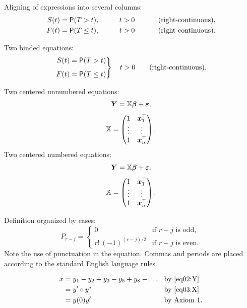 Aligning of expressions into several columns:
\begin{alignat*}{3}
S(t) &= \operatorname{\textsf{P}}(T > t),    &\qquad t&>0       &\qquad&\text{ (right-continuous),}\\
F(t) &= \operatorname{\textsf{P}}(T \leq t), &\qquad t&>0       &\qquad&\text{ (right-continuous).}
\end{alignat*}

Two binded equations:
\begin{equation}\label{eq01:FS}
\left.
\begin{aligned}
S(t) &= \operatorname{\textsf{P}}(T > t) \\[1ex]
F(t) &= \operatorname{\textsf{P}}(T \leq t)
\end{aligned}
\right\}
\quad t>0 \qquad \text{(right-continuous).}
\end{equation}

Two centered unnumbered equations:
\begin{gather*}
\bm Y = \mathbb{X}\bm\beta + \bm\varepsilon, \\[1ex]
\mathbb{X} = \begin{pmatrix} 1 & \bm x_1^\top \\ \vdots & \vdots \\ 1 &
  \bm x_n^\top \end{pmatrix}.
\end{gather*}
Two centered numbered equations:
\begin{gather}
\bm Y = \mathbb{X}\bm\beta + \bm\varepsilon, \label{eq02:Y}\\[1ex]
\mathbb{X} = \begin{pmatrix} 1 & \bm x_1^\top \label{eq03:X}\\ \vdots & \vdots \\ 1 &
  \bm x_n^\top \end{pmatrix}.
\end{gather}

Definition organized by cases:
\[
P_{r-j}=
\begin{cases}
0 & \text{if $r-j$ is odd},\\
r!\,(-1)^{(r-j)/2} & \text{if $r-j$ is even}.
\end{cases}
\]
Note the use of punctuation in the equation. Commas and periods are
placed according to the standard English language rules.

\begin{align}
x& = y_1-y_2+y_3-y_5+y_8-\dots && \text{by \eqref{eq02:Y}} \nonumber\\
& = y'\circ y^* && \text{by \eqref{eq03:X}} \nonumber\\
& = y(0) y' && \text {by Axiom 1.}
\end{align}


